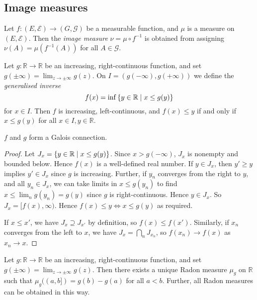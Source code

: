 \subsection{Image measures}
\begin{definition}
	Let \( f \colon (E,\mathcal E) \to (G,\mathcal G) \) be a measurable function, and \( \mu \) is a measure on \( (E, \mathcal E) \).
	Then the \emph{image measure} \( \nu = \mu \circ f^{-1} \) is obtained from assigning \( \nu(A) = \mu(f^{-1}(A)) \) for all \( A \in \mathcal G \).
\end{definition}
\begin{lemma}
	Let \( g \colon \mathbb R \to \mathbb R \) be an increasing, right-continuous function, and set \( g(\pm\infty) = \lim_{z \to \pm \infty} g(z) \).
	On \( I = (g(-\infty), g(+\infty)) \) we define the \emph{generalised inverse}
	\[ f(x) = \inf \qty{y \in \mathbb R \mid x \leq g(y)} \]
	for \( x \in I \).
	Then \( f \) is increasing, left-continuous, and \( f(x) \leq y \) if and only if \( x \leq g(y) \) for all \( x \in I, y \in \mathbb R \).
\end{lemma}
\begin{remark}
	\( f \) and \( g \) form a Galois connection.
\end{remark}
\begin{proof}
	Let \( J_x = \qty{y \in \mathbb R \mid x \leq g(y)} \).
	Since \( x > g(-\infty) \), \( J_x \) is nonempty and bounded below.
	Hence \( f(x) \) is a well-defined real number.
	If \( y \in J_x \), then \( y' \geq y \) implies \( y' \in J_x \) since \( g \) is increasing.
	Further, if \( y_n \) converges from the right to \( y \), and all \( y_n \in J_x \), we can take limits in \( x \leq g(y_n) \) to find \( x \leq \lim_n g(y_n) = g(y) \) since \( g \) is right-continuous.
	Hence \( y \in J_x \).
	So \( J_x = [f(x), \infty) \).
	Hence \( f(x) \leq y \iff x \leq g(y) \) as required.

	If \( x \leq x' \), we have \( J_x \supseteq J_{x'} \) by definition, so \( f(x) \leq f(x') \).
	Similarly, if \( x_n \) converges from the left to \( x \), we have \( J_x = \bigcap_n J_{x_n} \), so \( f(x_n) \to f(x) \) as \( x_n \to x \).
\end{proof}
\begin{theorem}
	Let \( g \colon \mathbb R \to \mathbb R \) be an increasing, right-continuous function, and set \( g(\pm\infty) = \lim_{z \to \pm \infty} g(z) \).
	Then there exists a unique Radon measure \( \mu_g \) on \( \mathbb R \) such that \( \mu_g((a,b]) = g(b) - g(a) \) for all \( a < b \).
	Further, all Radon measures can be obtained in this way.
\end{theorem}
